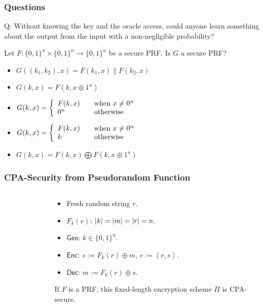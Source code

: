 \begin{frame}\frametitle{Questions}
\begin{alertblock}{Q: Without knowing the key and the oracle access, could anyone learn something about the output from the input with a non-negligible probability?} 
\end{alertblock}
\begin{exampleblock}{Let $F: \{0,1\}^{n} \times \{0,1\}^{n} \to \{0,1\}^{n}$ be a secure PRF. Is $G$ a secure PRF?}
\begin{itemize}
\item $G((k_{1},k_{2}), x) = F(k_{1},x) \| F(k_{2},x)$
\item $G(k,x) = F(k, x\oplus 1^{n})$
\item $ G(k,x) = \left\{ 
  \begin{array}{l l}
    F(k,x) & \quad \text{when}\ x \neq 0^{n}\\
    0^{n} & \quad \text{otherwise}\\
  \end{array} \right. $
\item $ G(k,x) = \left\{ 
  \begin{array}{l l}
    F(k,x) & \quad \text{when}\ x \neq 0^{n}\\
    k & \quad \text{otherwise}\\
  \end{array} \right. $
\item $G(k,x) = F(k,x)\bigoplus F(k, x\oplus 1^{n})$
\end{itemize}
\end{exampleblock}
\end{frame}
\begin{frame}\frametitle{CPA-Security from Pseudorandom Function}
\begin{columns}[t]
\begin{column}{4cm}
\begin{figure}
\begin{center}

\end{center}
\end{figure}
\end{column}
\begin{column}{6cm}
\begin{construction}\label{thm:cpa}
\begin{itemize}
\item Fresh random string $r$.
\item $F_k(r)$: $\lvert k\rvert = \lvert m\rvert = \lvert r\rvert = n$.
\item $\mathsf{Gen}$: $k \in \{0,1\}^n$.
\item $\mathsf{Enc}$: $s := F_k(r)\oplus m$, $c := \left<r, s\right>$.
\item $\mathsf{Dec}$: $m := F_k(r)\oplus s$.
\end{itemize}
\end{construction}
\begin{theorem}\label{thm:prf}
If $F$ is a PRF, this fixed-length encryption scheme $\Pi$ is CPA-secure.
\end{theorem}
\end{column}
\end{columns}
\end{frame}
